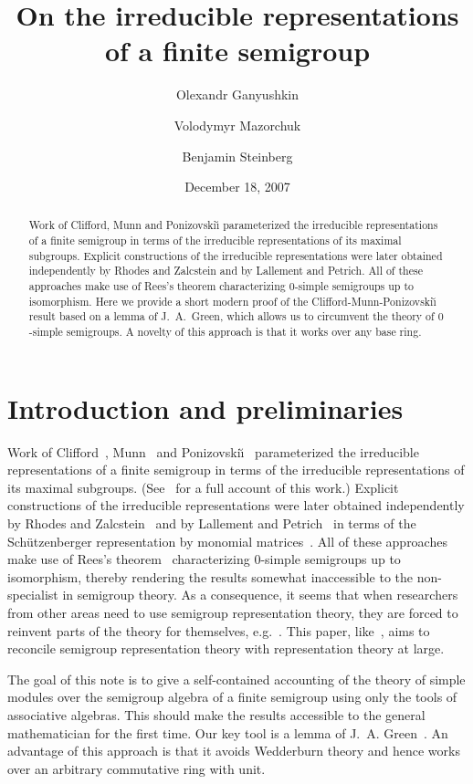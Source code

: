 \documentclass[reqno,11pt]{amsart}
\title{On the irreducible representations of a finite semigroup}
\author[O.~Ganyushkin]{Olexandr Ganyushkin}
\author[V.~Mazorchuk]{Volodymyr Mazorchuk}
\author[B.~Steinberg]{Benjamin Steinberg}
\date{December 18, 2007}
\numberwithin{equation}{section}
\begin{document}
\begin{abstract}
Work of Clifford, Munn and Ponizovski{\u\i} parameterized the irreducible
representations of a finite semigroup in terms of the irreducible
representations of its maximal subgroups.  Explicit constructions of
the irreducible representations were later obtained independently by
Rhodes and Zalcstein and by Lallement and Petrich.  All of these
approaches make use of Rees's
theorem characterizing $0$-simple semigroups up to isomorphism.  Here
we provide a short modern proof of the Clifford-Munn-Ponizovski{\u\i}
result based on a lemma of
J.~A.~Green, which allows us to circumvent the theory of $0$-simple
semigroups.  A novelty of this approach is that it works over any base
ring.
\end{abstract}
\maketitle

\section{Introduction and preliminaries}
Work of Clifford~\cite{Clifford1,Clifford2}, Munn~\cite{Munn1,Munn2} and Ponizovski{\u\i}~\cite{Poni} parameterized the irreducible
representations of a finite semigroup in terms of the irreducible
representations of its maximal subgroups. (See~\cite[Chapter 5]{CP}
for a full  account of this work.)  Explicit constructions of
the irreducible representations were later obtained independently by
Rhodes and Zalcstein~\cite{RhodesZalc} and by Lallement and
Petrich~\cite{LallePet} in terms of the Sch\"utzenberger representation by
monomial matrices~\cite{Schutzmonomial}.  All of these approaches
make use of Rees's theorem~\cite{Rees} characterizing $0$-simple semigroups up to
isomorphism, thereby rendering the results somewhat inaccessible to
the non-specialist in semigroup theory.  As a consequence, it seems that when
researchers from other areas need to use semigroup representation theory,
they are forced to reinvent parts of the theory for
themselves, e.g.~\cite{Brown1,Brown2}.  This paper,
like~\cite{mobius1,mobius2,Putcharep3}, aims to reconcile semigroup
representation theory with representation theory at large.

The goal of this note is to give a self-contained accounting of the
theory of simple modules over the semigroup algebra of a finite semigroup
using only the tools of associative algebras.  This should make
the results accessible to the general mathematician for the first
time.  Our key tool is a lemma of J.~A. Green~\cite{Greenpoly}.  An advantage of this approach is
that it avoids Wedderburn theory and hence works over an arbitrary commutative ring with unit.
\end{document}
